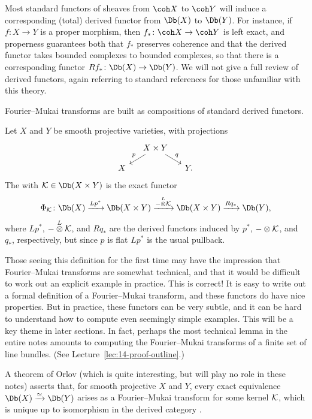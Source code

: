 \documentclass{amsart}
\begin{document}
Most standard functors of sheaves from $\coh X$ to $\coh Y$ will induce a corresponding (total) derived functor from $\Db(X)$ to $\Db(Y)$.  For instance, if $f\colon X\to Y$ is a proper morphism, then $f_*\colon \coh X\to \coh Y$ is left exact, and properness guarantees both that $f_*$ preserves coherence and that the derived functor takes bounded complexes to bounded complexes, so that there is a corresponding functor $Rf_*\colon \Db(X)\to \Db(Y)$.  We will not give a full review of derived functors, again referring to standard references for those unfamiliar with this theory.

Fourier--Mukai transforms are built as compositions of standard derived functors.

\begin{defn}\label{defn:FMtransform}
  Let $X$ and $Y$ be smooth projective varieties, with projections
  \[\begin{tikzcd}[column sep=small, row sep=small]
    & X\times Y \arrow[dl,"p"'] \arrow[dr,"q"] & \\
    X & & Y.
  \end{tikzcd}\]
  The  with  $\cK\in \Db(X\times Y)$ is the exact functor
  \[ \Phi_\cK\colon \Db(X) \xto{Lp^*} \Db(X \times Y) \xto{-\Lotimes\cK} \Db(X \times Y) \xto{Rq_*} \Db(Y), \]
  where $Lp^*$, $-\overset{L}{\otimes}\mathcal{K}$, and $Rq_*$ are the derived functors induced by $p^*$, $-\otimes\mathcal{K}$, and $q_*$, respectively, but since $p$ is flat $Lp^*$ is the usual pullback.
\end{defn}

\begin{remark}
    Those seeing this definition for the first time may have the impression that Fourier--Mukai transforms are somewhat technical, and that it would be difficult to work out an explicit example in practice.  This is correct!  It is easy to write out a formal definition of a Fourier--Mukai transform, and these functors do have nice properties.  But in practice, these functors can be very subtle, and it can be hard to understand how to compute even seemingly simple examples.  This will be a key theme in later sections.  In fact, perhaps the most technical lemma in the entire notes amounts to computing the Fourier--Mukai transforms of a finite set of line bundles.  (See Lecture~\ref{lec:14-proof-outline}.)
\end{remark}


\begin{remark}
    A theorem of Orlov (which is quite interesting, but will play no role in these notes) asserts that, for smooth projective $X$ and $Y$, every exact equivalence $\Db(X)\xto{\simeq}\Db(Y)$ arises as a Fourier--Mukai transform for some kernel $\mathcal{K}$, which is unique up to isomorphism in the derived category \cite{Orlov97}.
\end{remark}
\end{document}
